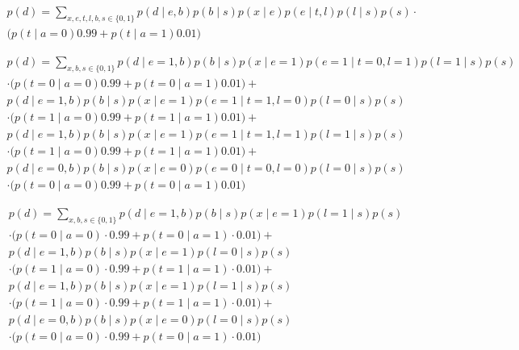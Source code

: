 \documentclass[12pt]{report}
\begin{document}
\begin{align*}    
    p(d) = \sum_{x,e,t,l,b,s \in \{0,1\}}   p(d\mid e,b)p(b\mid s)p(x\mid e)p(e\mid t,l)p(l\mid s)p(s)  \cdot \\
    \Bigg( p(t\mid a = 0)0.99 + p(t\mid a = 1)0.01 \Bigg)
\end{align*}




\begin{align*}    
    p(d) = \sum_{x,b,s \in \{0,1\}}  
        p(d\mid e=1,b)p(b\mid s)p(x\mid e=1)p(e=1\mid t=0,l=1)p(l=1\mid s)p(s) \\ \cdot \Bigg( p(t=0\mid a = 0)0.99 + p(t=0\mid a = 1)0.01 \Bigg) + \\
        p(d\mid e=1,b)p(b\mid s)p(x\mid e=1)p(e=1\mid t=1,l=0)p(l=0\mid s)p(s) \\ \cdot \Bigg( p(t=1\mid a = 0)0.99 + p(t=1\mid a = 1)0.01 \Bigg) + \\ 
        p(d\mid e=1,b)p(b\mid s)p(x\mid e=1)p(e=1\mid t=1,l=1)p(l=1\mid s)p(s) \\ \cdot \Bigg( p(t=1\mid a = 0)0.99 + p(t=1\mid a = 1)0.01 \Bigg) + \\
        p(d\mid e=0,b)p(b\mid s)p(x\mid e=0)p(e=0\mid t=0,l=0)p(l=0\mid s)p(s) \\ \cdot \Bigg( p(t=0\mid a = 0)0.99 + p(t=0\mid a = 1)0.01 \Bigg)
\end{align*}


\begin{align*}    
    p(d) = \sum_{x,b,s \in \{0,1\}}  
        p(d\mid e=1,b)p(b\mid s)p(x\mid e=1)p(l=1\mid s)p(s) \\ \cdot  \Bigg( p(t=0\mid a = 0) \cdot 0.99 + p(t=0\mid a = 1) \cdot 0.01 \Bigg) + \\
        p(d\mid e=1,b)p(b\mid s)p(x\mid e=1)p(l=0\mid s)p(s) \\ \cdot  \Bigg( p(t=1\mid a = 0) \cdot 0.99 + p(t=1\mid a = 1) \cdot 0.01 \Bigg) + \\ 
        p(d\mid e=1,b)p(b\mid s)p(x\mid e=1)p(l=1\mid s)p(s) \\ \cdot  \Bigg( p(t=1\mid a = 0) \cdot 0.99 + p(t=1\mid a = 1) \cdot 0.01 \Bigg) + \\
        p(d\mid e=0,b)p(b\mid s)p(x\mid e=0)p(l=0\mid s)p(s) \\ \cdot  \Bigg( p(t=0\mid a = 0) \cdot 0.99 + p(t=0\mid a = 1) \cdot 0.01 \Bigg)
\end{align*}
\end{document}
